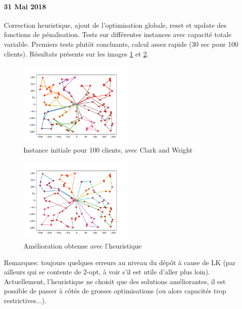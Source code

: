 \documentclass[a4paper,11pt]{article}%
\begin{document}
\paragraph*{31 Mai 2018}

Correction heuristique, ajout de l'optimisation globale, reset et update des fonctions de pénalisation. Tests sur différentes instances avec capacité totale variable. Premiers tests plutôt concluants, calcul assez rapide (30 sec pour 100 clients). Résultats présents sur les images \ref{test2_Heu_init} et \ref{test2_Heu_imp}. 

\begin{figure}[ht]
\centering
\includegraphics[width=0.5\textwidth]{test2_heuristic_init.png}
	\caption{Instance initiale pour 100 clients, avec Clark and Wright}
	\label{test2_Heu_init}
\end{figure}

\begin{figure}[ht]
\centering
\includegraphics[width=0.5\textwidth]{test2_heuristic_res.png}
	\caption{Amélioration obtenue avec l'heuristique}
	\label{test2_Heu_imp}
\end{figure}


Remarques: toujours quelques erreurs au niveau du dépôt à cause de LK (par ailleurs qui se contente de 2-opt, à voir s'il est utile d'aller plus loin). Actuellement, l'heuristique ne choisit que des solutions améliorantes, il est possible de passer à côtés de grosses optimisations (ou alors capacités trop restrictives...).  
\end{document}
